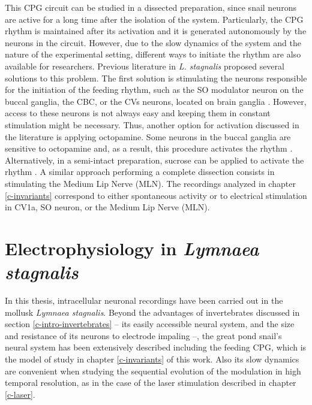 
This CPG circuit can be studied in a dissected preparation, since snail neurons are active for a long time after the isolation of the system. Particularly, the CPG rhythm is maintained after its activation and it is generated autonomously by the neurons in the circuit. However, due to the slow dynamics of the system and the nature of the experimental setting, different ways to initiate the rhythm are also available for researchers. Previous literature in \textit{L. stagnalis} proposed several solutions to this problem. The first solution is stimulating the neurons responsible for the initiation of the feeding rhythm, such as the SO modulator neuron on the buccal ganglia, the CBC, or the CVs neurons, located on brain ganglia \parencite{benjamin_distributed_2012}. However, access to these neurons is not always easy and keeping them in constant stimulation might be necessary. Thus, another option for activation discussed in the literature is applying octopamine. Some neurons in the buccal ganglia are sensitive to octopamine and, as a result, this procedure activates the rhythm \parencite{vehovszky_octopaminecontaining_2004}. Alternatively, in a semi-intact preparation, sucrose can be applied to activate the rhythm \parencite{vavoulis_dynamic_2007,vehovszky_octopaminecontaining_2004,straub_endogenous_2002}. A similar approach performing a complete dissection consists in stimulating the Medium Lip Nerve (MLN). 
The recordings analyzed in chapter \ref{c-invariants} correspond to either spontaneous activity or to electrical stimulation in CV1a, SO neuron, or the Medium Lip Nerve (MLN).

\section{Electrophysiology in \textit{Lymnaea stagnalis}}

\label{subsec:preparation}
In this thesis, intracellular neuronal recordings have been carried out in the mollusk \textit{Lymnaea stagnalis}. Beyond the advantages of invertebrates discussed in section \ref{c-intro-invertebrates} -- its easily accessible neural system, and the size and resistance of its neurons to electrode impaling --, the great pond snail's neural system has been extensively described including the feeding CPG,  which is the model of study in chapter \ref{c-invariants} of this work. Also its slow dynamics are convenient when studying   the sequential evolution of the modulation in high temporal resolution, as in the case of the laser stimulation described in chapter \ref{c-laser}. 

